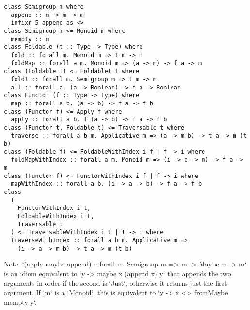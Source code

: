 \documentclass[11pt, twoside, reqno]{book}
\begin{document}
\begin{appdices}
\begin{verbatim}
class Semigroup m where
  append :: m -> m -> m
  infixr 5 append as <>
class Semigroup m <= Monoid m where
  mempty :: m
class Foldable (t :: Type -> Type) where
  fold :: forall m. Monoid m => t m -> m
  foldMap :: forall a m. Monoid m => (a -> m) -> f a -> m
class (Foldable t) <= Foldable1 t where
  fold1 :: forall m. Semigroup m => t m -> m
  all :: forall a. (a -> Boolean) -> f a -> Boolean
class Functor (f :: Type -> Type) where
  map :: forall a b. (a -> b) -> f a -> f b
class (Functor f) <= Apply f where
  apply :: forall a b. f (a -> b) -> f a -> f b
class (Functor t, Foldable t) <= Traversable t where
  traverse :: forall a b m. Applicative m => (a -> m b) -> t a -> m (t b)
class (Foldable f) <= FoldableWithIndex i f | f -> i where
  foldMapWithIndex :: forall a m. Monoid m => (i -> a -> m) -> f a -> m
class (Functor f) <= FunctorWithIndex i f | f -> i where
  mapWithIndex :: forall a b. (i -> a -> b) -> f a -> f b
class
  (
    FunctorWithIndex i t,
    FoldableWithIndex i t,
    Traversable t
  ) <= TraversableWithIndex i t | t -> i where
  traverseWithIndex :: forall a b m. Applicative m =>
    (i -> a -> m b) -> t a -> m (t b)
\end{verbatim}

Note: \inHS`(apply maybe append) :: forall m. Semigroup m => m -> Maybe m -> m` is an idiom equivalent to \inHS`\x y -> maybe x (append x) y` that appends the two arguments in order if the second is \inHS`Just`, otherwise it returns just the first argument.
If \inHS`m` is a \inHS`Monoid`, this is equivalent to \inHS`\x y -> x <> fromMaybe mempty y`.

\end{appdices}


\end{document}
